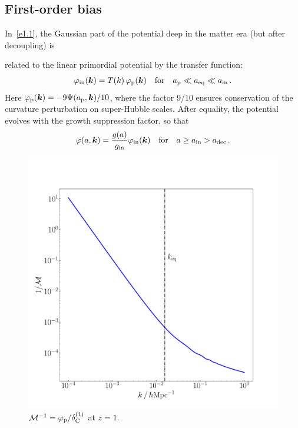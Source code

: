 \subsection{First-order bias}
%
In~\eqref{e1.1}, the Gaussian part of the potential deep in the matter era {(but after decoupling)} is {related to the linear primordial potential by the transfer function:
\begin{equation} \label{vpe}
\varphi_{{\mathrm{in}}}(\bm {k})=T(k)\,\varphi_{\mathrm{p}}(\bm {k}) {\quad \mbox{for}\quad a_{\mathrm{p}}\ll a_{\mathrm{eq}} \ll a_{{\mathrm{in}}} \,. }
\end{equation}
{Here $\varphi_{\mathrm{p}}(\bm {k})=-9
\Psi(a_{\mathrm{p}},\bm {k})/10$, where  the factor 9/10 ensures conservation of the curvature perturbation on super-Hubble scales.}
After equality, the potential evolves with the growth suppression factor, so that
\begin{equation}\label{pottp}
{\varphi(a,\bm {k}) = \frac{g(a)}{g_{{\mathrm{in}}}}  \varphi_{{\mathrm{in}}}(\bm {k}) \quad \mbox{for}\quad a\geq a_{{\mathrm{in}}}> {a_{\mathrm{dec}}}\,.}
\end{equation}
\begin{figure}[!ht]
\centering
\includegraphics[width=.8\textwidth]{fig/Mplot.pdf}
\caption{{${\cal M}^{-1}= \varphi_{\mathrm{p}}/\delta^{{(1)}}_{\mathrm{C}}$ at $z=1$.}}
\label{mplot}
\end{figure}

}
